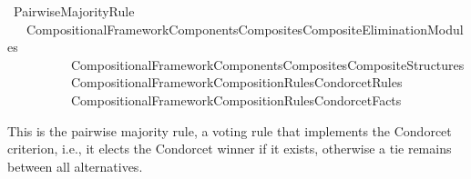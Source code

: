 %
\begin{isabellebody}%
%
%
\isadelimdocument
\isanewline
%
\endisadelimdocument
%
\isatagdocument
\isanewline
%
\isamarkuptrue%
%
\endisatagdocument
{\isafolddocument}%
%
\isadelimdocument
%
\endisadelimdocument
%
\isadelimtheory
%
\endisadelimtheory
%
\isatagtheory
{}\isamarkupfalse%
\ Pairwise{\isacharunderscore}{\kern0pt}Majority{\isacharunderscore}{\kern0pt}Rule\isanewline
\ \ \ {\isachardoublequoteopen}{\isachardot}{\kern0pt}{\isachardot}{\kern0pt}{\isacharslash}{\kern0pt}Compositional{\isacharunderscore}{\kern0pt}Framework{\isacharslash}{\kern0pt}Components{\isacharslash}{\kern0pt}Composites{\isacharslash}{\kern0pt}Composite{\isacharunderscore}{\kern0pt}Elimination{\isacharunderscore}{\kern0pt}Modules{\isachardoublequoteclose}\isanewline
\ \ \ \ \ \ \ \ \ \ {\isachardoublequoteopen}{\isachardot}{\kern0pt}{\isachardot}{\kern0pt}{\isacharslash}{\kern0pt}Compositional{\isacharunderscore}{\kern0pt}Framework{\isacharslash}{\kern0pt}Components{\isacharslash}{\kern0pt}Composites{\isacharslash}{\kern0pt}Composite{\isacharunderscore}{\kern0pt}Structures{\isachardoublequoteclose}\isanewline
\ \ \ \ \ \ \ \ \ \ {\isachardoublequoteopen}{\isachardot}{\kern0pt}{\isachardot}{\kern0pt}{\isacharslash}{\kern0pt}Compositional{\isacharunderscore}{\kern0pt}Framework{\isacharslash}{\kern0pt}Composition{\isacharunderscore}{\kern0pt}Rules{\isacharslash}{\kern0pt}Condorcet{\isacharunderscore}{\kern0pt}Rules{\isachardoublequoteclose}\isanewline
\ \ \ \ \ \ \ \ \ \ {\isachardoublequoteopen}{\isachardot}{\kern0pt}{\isachardot}{\kern0pt}{\isacharslash}{\kern0pt}Compositional{\isacharunderscore}{\kern0pt}Framework{\isacharslash}{\kern0pt}Composition{\isacharunderscore}{\kern0pt}Rules{\isacharslash}{\kern0pt}Condorcet{\isacharunderscore}{\kern0pt}Facts{\isachardoublequoteclose}\isanewline
\isanewline
{}%
\endisatagtheory
{\isafoldtheory}%
%
\isadelimtheory
%
\endisadelimtheory
%
\begin{isamarkuptext}%
This is the pairwise majority rule, a voting rule that implements the
Condorcet criterion, i.e., it elects the Condorcet winner if it exists,
otherwise a tie remains between all alternatives.%
\end{isamarkuptext}\isamarkuptrue%
%
\isadelimdocument
%
\endisadelimdocument
%
\isatagdocument
%
\isamarkuptrue%
%
\endisatagdocument
{\isafolddocument}%

\end{isabellebody}
